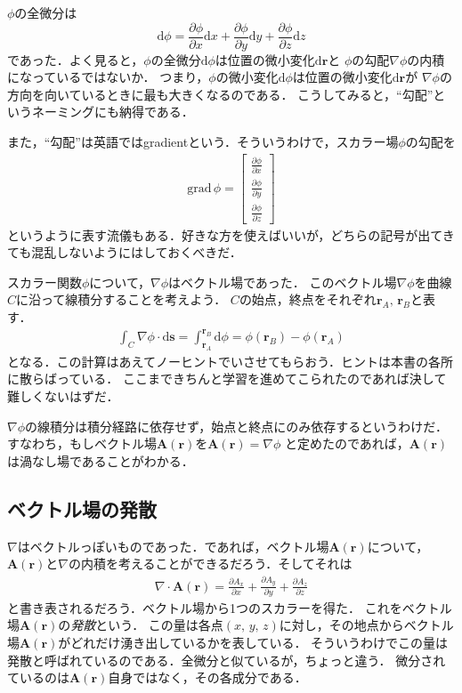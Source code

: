 $\phi$の全微分は
$$
\mathrm{d} \phi = \frac{\partial \phi}{\partial x} \mathrm{d} x 
+ \frac{\partial \phi}{\partial y} \mathrm{d} y +  \frac{\partial \phi}{\partial z} \mathrm{d} z
$$
であった．よく見ると，$\phi$の全微分$\mathrm{d}\phi$は位置の微小変化$\mathrm{d}\bm{r}$と
$\phi$の勾配$\nabla \phi$の内積になっているではないか．
つまり，$\phi$の微小変化$\mathrm{d}\phi$は位置の微小変化$\mathrm{d}\bm{r}$が
$\nabla \phi$の方向を向いているときに最も大きくなるのである．
こうしてみると，``勾配''というネーミングにも納得である．

また，``勾配''は英語ではgradientという．そういうわけで，スカラー場$\phi$の勾配を
\begin{eqnarray}
\mathrm{grad} \, \phi = \left[
 \begin{array}{c}
\displaystyle
\frac{\partial \phi}{\partial x} \\
\displaystyle
\frac{\partial \phi}{\partial y} \\
\displaystyle
\frac{\partial \phi}{\partial z} 
 \end{array}
\right]
\label{eq:gradgrad}
\end{eqnarray}
というように表す流儀もある．好きな方を使えばいいが，どちらの記号が出てきても混乱しないようにはしておくべきだ．

スカラー関数$\phi$について，$\nabla \phi$はベクトル場であった．
このベクトル場$\nabla \phi$を曲線$C$に沿って線積分することを考えよう．
$C$の始点，終点をそれぞれ$\bm{r}_A, \, \bm{r}_B$と表す．
\begin{align*}
\int_C \nabla \phi \cdot \mathrm{d}\bm{s} 
= \int_{\bm{r}_A}^{\bm{r}_B} \mathrm{d} \phi = \phi (\bm{r}_B) - \phi (\bm{r}_A) 
\end{align*}
となる．この計算はあえてノーヒントでいさせてもらおう．ヒントは本書の各所に散らばっている．
ここまできちんと学習を進めてこられたのであれば決して難しくないはずだ．

$\nabla \phi$の線積分は積分経路に依存せず，始点と終点にのみ依存するというわけだ．
すなわち，もしベクトル場$\bm{A}(\bm{r})$を$\bm{A}(\bm{r})=\nabla \phi$
と定めたのであれば，$\bm{A}(\bm{r})$は渦なし場であることがわかる．

\subsection{ベクトル場の発散}
$\nabla$はベクトルっぽいものであった．であれば，ベクトル場$\bm{A}(\bm{r})$について，
$\bm{A}(\bm{r})$と$\nabla$の内積を考えることができるだろう．そしてそれは
\begin{eqnarray}
\nabla \cdot \bm{A} (\bm{r}) =  \frac{\partial A_x}{\partial x} + \frac{\partial A_y}{\partial y} +  \frac{\partial A_z}{\partial z}
\label{eq:divnabla}
\end{eqnarray}
と書き表されるだろう．ベクトル場から1つのスカラーを得た．
これをベクトル場$\bm{A}(\bm{r})$の\emph{発散}という．
この量は各点$(x, \, y, \, z)$に対し，その地点からベクトル場$\bm{A}(\bm{r})$がどれだけ湧き出しているかを表している．
そういうわけでこの量は発散と呼ばれているのである．全微分と似ているが，ちょっと違う．
微分されているのは$\bm{A}(\bm{r})$自身ではなく，その各成分である．

